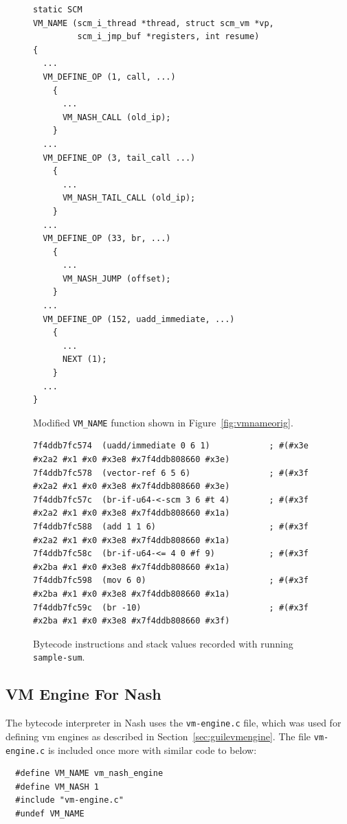 \documentclass[preprint, 10pt]{sigplanconf}
\begin{document}
\begin{figure}
  \centering
  \small
\begin{verbatim}
static SCM
VM_NAME (scm_i_thread *thread, struct scm_vm *vp,
         scm_i_jmp_buf *registers, int resume)
{
  ...
  VM_DEFINE_OP (1, call, ...)
    {
      ...
      VM_NASH_CALL (old_ip);
    }
  ...
  VM_DEFINE_OP (3, tail_call ...)
    {
      ...
      VM_NASH_TAIL_CALL (old_ip);
    }
  ...
  VM_DEFINE_OP (33, br, ...)
    {
      ...
      VM_NASH_JUMP (offset);
    }
  ...
  VM_DEFINE_OP (152, uadd_immediate, ...)
    {
      ...
      NEXT (1);
    }
  ...
}
\end{verbatim}
\caption{Modified \texttt{VM\_NAME} function shown in
  Figure~\hyperref[fig:vmnameorig]{\ref{fig:vmnameorig}}.}
\label{fig:vmnamenash}
\end{figure}

\begin{figure}
  \centering
  \small
\begin{verbatim}
7f4ddb7fc574  (uadd/immediate 0 6 1)            ; #(#x3e #x2a2 #x1 #x0 #x3e8 #x7f4ddb808660 #x3e)
7f4ddb7fc578  (vector-ref 6 5 6)                ; #(#x3f #x2a2 #x1 #x0 #x3e8 #x7f4ddb808660 #x3e)
7f4ddb7fc57c  (br-if-u64-<-scm 3 6 #t 4)        ; #(#x3f #x2a2 #x1 #x0 #x3e8 #x7f4ddb808660 #x1a)
7f4ddb7fc588  (add 1 1 6)                       ; #(#x3f #x2a2 #x1 #x0 #x3e8 #x7f4ddb808660 #x1a)
7f4ddb7fc58c  (br-if-u64-<= 4 0 #f 9)           ; #(#x3f #x2ba #x1 #x0 #x3e8 #x7f4ddb808660 #x1a)
7f4ddb7fc598  (mov 6 0)                         ; #(#x3f #x2ba #x1 #x0 #x3e8 #x7f4ddb808660 #x1a)
7f4ddb7fc59c  (br -10)                          ; #(#x3f #x2ba #x1 #x0 #x3e8 #x7f4ddb808660 #x3f)
\end{verbatim}
\caption{Bytecode instructions and stack values recorded with running
  \texttt{sample-sum}.}
\label{fig:trace}
\end{figure}

\subsection{VM Engine For Nash}
The bytecode interpreter in Nash uses the \texttt{vm-engine.c} file, which was
used for defining vm engines as described in
Section~\hyperref[sec:background]{\ref{sec:guilevmengine}}.  The file
\texttt{vm-engine.c} is included once more with similar code to below:

\begin{verbatim}
  #define VM_NAME vm_nash_engine
  #define VM_NASH 1
  #include "vm-engine.c"
  #undef VM_NAME
\end{verbatim}
\end{document}
